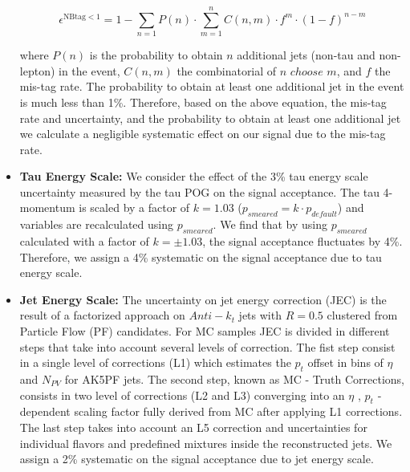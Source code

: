\begin{itemize}
\begin{equation}\label{eq:nttbar}
  \epsilon^{\textrm{NBtag} < 1} = 1 - \sum_{n=1} P(n) \cdot \sum_{m=1}^{n} C(n,m) \cdot f^{m} \cdot (1-f)^{n-m}
\end{equation}

where $P(n)$ is the probability to obtain $n$ additional jets (non-tau and non-lepton) in the event, $C(n,m)$ the 
combinatorial of $n$ $choose$ $m$, and $f$ the mis-tag rate. The probability to 
obtain at least one additional jet in the event is much less than 1\%. Therefore, based on the above equation, the 
mis-tag rate and uncertainty, and the probability to obtain at least one additional jet we calculate a negligible 
systematic effect on our signal due to the mis-tag rate.

  \item \textbf{Tau Energy Scale:} We consider the effect of the 3\% tau energy scale uncertainty measured by the tau 
POG on the signal acceptance. The tau 4-momentum is scaled by a factor of $k=1.03$ ($p_{smeared} = k \cdot 
p_{default}$) and variables are recalculated using $p_{smeared}$. We find that by using $p_{smeared}$ calculated with 
a factor of $k=\pm 1.03$, the signal acceptance fluctuates by 4\%. Therefore, we assign a 4\% systematic on the signal 
acceptance due to tau energy scale.
  \item \textbf{Jet Energy Scale:}  The uncertainty on jet energy correction (JEC) is the result of a factorized approach on $Anti­-k_{t}$ jets with $R=0.5$ clustered from Particle Flow (PF) candidates. For MC samples JEC is divided in different steps that take into account several levels of correction. The fist step consist in a single level of corrections (L1) which estimates the $p_{t}$ offset in bins of $\eta$ and $N_{PV}$ for AK5PF jets. The second step, known as MC­ - Truth Corrections, consists in two level of corrections (L2 and L3) converging into an $\eta$ , $p_{t}$ ­dependent scaling factor fully derived from MC after applying L1­ corrections. The last step takes into account an L5 correction and uncertainties for individual flavors and predefined mixtures inside the reconstructed jets. We assign a 2\% systematic on the signal acceptance due to jet energy scale.

\end{itemize}
